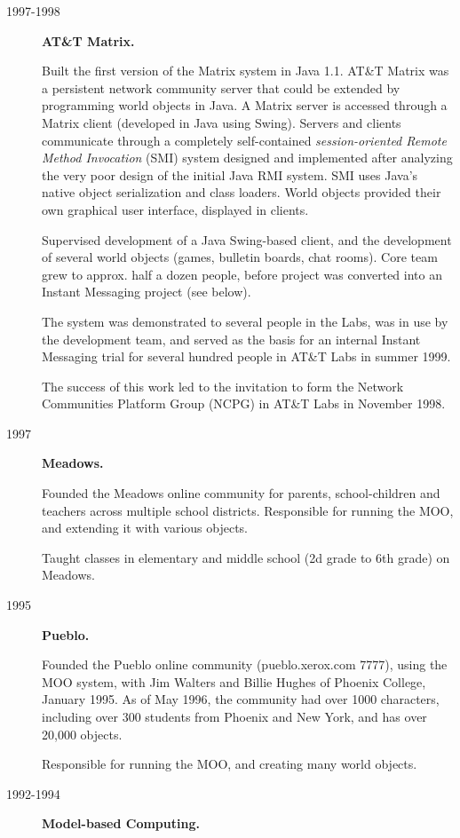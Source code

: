 \documentclass{article}
\begin{document}
\begin{description}
\item[1997-1998]   \textbf{AT\&T Matrix.}

  Built the first version of the Matrix system in
  Java 1.1.  AT\&T Matrix was a persistent network community server that
  could be extended by programming world objects in Java.  A Matrix
  server is accessed through a Matrix client (developed in Java using
  Swing).  Servers and clients communicate through a completely
  self-contained \textit{session-oriented Remote Method Invocation} (SMI)
  system designed and implemented after analyzing the very poor design
  of the initial Java RMI system.  SMI uses Java's native object
  serialization and class loaders.  World objects provided their own
  graphical user interface, displayed in clients.

  Supervised development of a Java Swing-based client, and the
  development of several world objects (games, bulletin boards, chat
  rooms).  Core team grew to approx. half a dozen people, before
  project was converted into an Instant Messaging project (see below).

  The system was demonstrated to several people in the Labs, was in
  use by the development team, and served as the basis for an internal
  Instant Messaging trial for several hundred people in AT\&T Labs in
  summer 1999.

  The success of this work led to the invitation to form the Network
  Communities Platform Group (NCPG) in AT\&T Labs in November 1998.

\item[1997]\textbf{Meadows.}

 Founded the Meadows online community for parents, school-children and
 teachers across multiple school districts. Responsible for running
 the MOO, and extending it with various objects.

 Taught classes in elementary and middle school (2d grade to 6th
 grade) on Meadows.


\item[1995]\textbf{Pueblo.}

Founded the Pueblo online community (pueblo.xerox.com 7777), using the
 MOO system, with Jim Walters and Billie Hughes of Phoenix College,
 January 1995. As of May 1996, the community had over 1000 characters,
 including over 300 students from Phoenix and New York, and has over
 20,000 objects.

 Responsible for running the MOO, and creating many world objects.

\item[1992-1994]\textbf{Model-based Computing.} 


\end{description}
\end{document}
